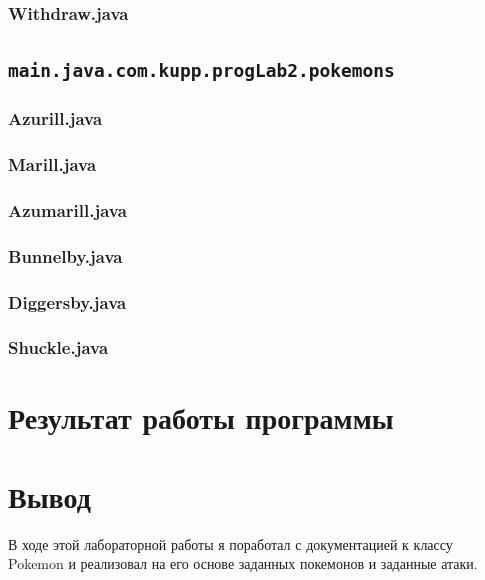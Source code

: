 \documentclass[11pt]{article}
\begin{document}
\subsubsection{Withdraw.java}

\pagebreak
\subsection{\texttt{main.java.com.kupp.progLab2.pokemons}}
\subsubsection{Azurill.java}

\subsubsection{Marill.java}

\subsubsection{Azumarill.java}

\pagebreak
\subsubsection{Bunnelby.java}

\subsubsection{Diggersby.java}

\subsubsection{Shuckle.java}

\section{Результат работы программы}

\section{Вывод}
В ходе этой лабораторной работы я поработал с документацией к классу Pokemon и реализовал на его основе заданных покемонов и заданные атаки. 
\end{document}
